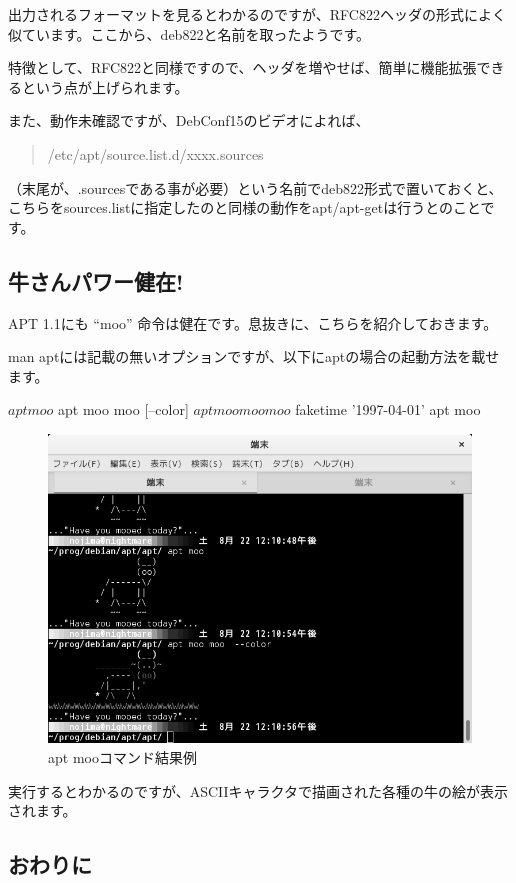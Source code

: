 \documentclass[mingoth,a4paper]{jsarticle}
\begin{document}
 出力されるフォーマットを見るとわかるのですが、RFC822ヘッダの形式によく似ています。ここから、deb822と名前を取ったようです。

  特徴として、RFC822と同様ですので、ヘッダを増やせば、簡単に機能拡張できるという点が上げられます。

  また、動作未確認ですが、DebConf15のビデオによれば、
\begin{quote}
  /etc/apt/source.list.d/xxxx.sources
\end{quote}
（末尾が、.sourcesである事が必要）という名前でdeb822形式で置いておくと、
こちらをsources.listに指定したのと同様の動作をapt/apt-getは行うとのことです。
  
\subsection{牛さんパワー健在!}

 APT 1.1にも ``moo'' 命令は健在です。息抜きに、こちらを紹介しておきます。

 man aptには記載の無いオプションですが、以下にaptの場合の起動方法を載せます。

\begin{commandline}  
$ apt moo 
$ apt moo moo [--color]
$ apt moo moo moo  
$ faketime '1997-04-01' apt moo
\end{commandline}    

\begin{figure}[H]
\begin{center}
 \includegraphics[width=0.7\hsize]{image201508/apt-moo_mono.png}
\end{center}
\caption{apt mooコマンド結果例}
\end{figure}

 実行するとわかるのですが、ASCIIキャラクタで描画された各種の牛の絵が表示されます。

\subsection{おわりに}
\end{document}

